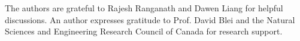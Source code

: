 
The authors are grateful to Rajesh Ranganath and Dawen Liang for helpful discussions. An author expresses gratitude to Prof. David Blei and the Natural Sciences and Engineering Research Council of Canada for research support.
